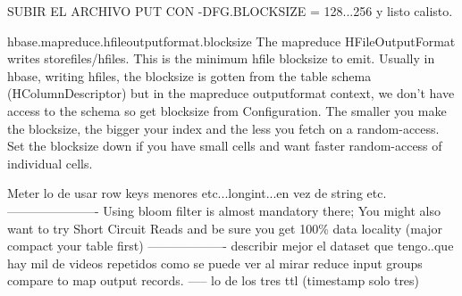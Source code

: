 SUBIR EL ARCHIVO PUT CON -DFG.BLOCKSIZE = 128...256 y listo calisto.


hbase.mapreduce.hfileoutputformat.blocksize
The mapreduce HFileOutputFormat writes storefiles/hfiles. This is the minimum hfile blocksize to emit. Usually in hbase, writing hfiles, the blocksize is gotten from the table schema (HColumnDescriptor) but in the mapreduce outputformat context, we don't have access to the schema so get blocksize from Configuration. The smaller you make the blocksize, the bigger your index and the less you fetch on a random-access. Set the blocksize down if you have small cells and want faster random-access of individual cells.








Meter lo de usar row keys menores etc...longint...en vez de string etc.
----------------------
Using bloom filter is almost mandatory there;
You might also want to try Short Circuit Reads and be sure you get 100\%
data locality (major compact your table first)
-------------------
describir mejor el dataset que tengo..que hay mil de videos repetidos como se puede ver al mirar reduce input groups compare to map output records.
-----
lo de los tres ttl (timestamp solo tres)

